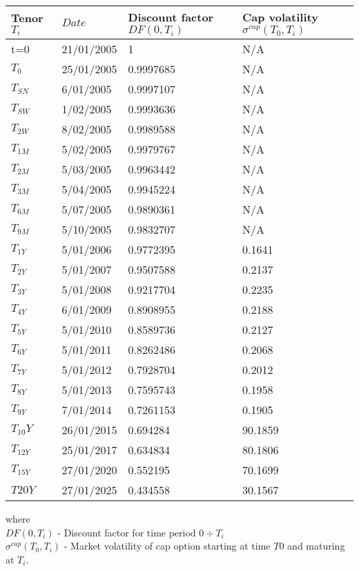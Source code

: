 \documentclass[11pt]{article}
\numberwithin{equation}{subsection}
\begin{document}
{
	\centering
	\begin{tabular}{|l|l|l|l|}
		\hline
		Tenor \(T_i\) & \(Date\) & Discount factor \(DF(0, T_i)\) & Cap volatility \(\sigma^{cap}(T_0, T_i)\) \\		
		\hline		
		t=0	  &  21/01/2005 &  1	      &  N/A \\
		\hline
		\(T_0\)	  &  25/01/2005 &  0.9997685  &  N/A \\
		\hline
		\(T_{SN}\)  &  6/01/2005  &  0.9997107  &  N/A \\
		\hline
		\(T_{SW}\)  &  1/02/2005  &  0.9993636  &  N/A \\
		\hline
		\(T_{2W}\)  &  8/02/2005  &  0.9989588  &  N/A \\
		\hline
		\(T_{1M}\)  &  5/02/2005  &  0.9979767  &  N/A \\
		\hline
		\(T_{2M}\)  &  5/03/2005  &  0.9963442  &  N/A \\
		\hline
		\(T_{3M}\)  &  5/04/2005  &  0.9945224  &  N/A \\
		\hline
		\(T_{6M}\)  &  5/07/2005  &  0.9890361  &  N/A \\
		\hline
		\(T_{9M}\)  &  5/10/2005  &  0.9832707  &  N/A \\
		\hline
		\(T_{1Y}\)  &  5/01/2006  &  0.9772395  &  0.1641 \\
		\hline
		\(T_{2Y}\)  &  5/01/2007  &  0.9507588  &  0.2137 \\
		\hline
		\(T_{3Y}\)  &  5/01/2008  &  0.9217704  &  0.2235 \\
		\hline
		\(T_{4Y}\)  &  6/01/2009  &  0.8908955  &  0.2188 \\
		\hline
		\(T_{5Y}\)  &  5/01/2010  &  0.8589736  &  0.2127 \\
		\hline
		\(T_{6Y}\)  &  5/01/2011  &  0.8262486  &  0.2068 \\
		\hline
		\(T_{7Y}\)  &  5/01/2012  &  0.7928704  &  0.2012 \\
		\hline
		\(T_{8Y}\)  &  5/01/2013  &  0.7595743  &  0.1958 \\
		\hline
		\(T_{9Y}\)  &  7/01/2014  &  0.7261153  &  0.1905 \\
		\hline
		\(T_{10}Y\)  &  26/01/2015 &  0.694284   &  90.1859 \\
		\hline
		\(T_{12Y}\)  &  25/01/2017 &  0.634834   &  80.1806 \\
		\hline
		\(T_{15Y}\)  &  27/01/2020 &  0.552195   &  70.1699 \\
		\hline
		\(T{20Y}\)  &  27/01/2025 &  0.434558   &  30.1567 \\
		\hline				 				
	\end{tabular}
}
\vskip 0.4cm
where \\
\(DF(0, T_i)\) - Discount factor for time period \(0÷T_i\)\\
\(\sigma^{cap}(T_0, T_i)\) - Market volatility of cap option starting at time \(T0\) and maturing at \(T_i\).
\end{document}
